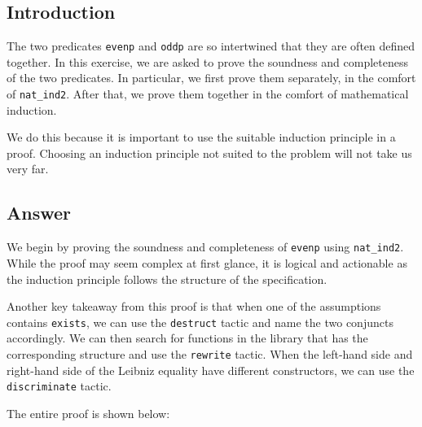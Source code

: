\documentclass{article}
\begin{document}
\subsection{Introduction}
The two predicates \texttt{evenp} and \texttt{oddp} are so intertwined that they are often defined together. In this exercise, we are asked to prove the soundness and completeness of the two predicates. In particular, we first prove them separately, in the comfort of \texttt{nat\_ind2}. After that, we prove them together in the comfort of mathematical induction. 

We do this because it is important to use the suitable induction principle in a proof. Choosing an induction principle not suited to the problem will not take us very far. 

\subsection{Answer}
We begin by proving the soundness and completeness of \texttt{evenp} using \texttt{nat\_ind2}. While the proof may seem complex at first glance, it is logical and actionable as the induction principle follows the structure of the specification. 

Another key takeaway from this proof is that when one of the assumptions contains \texttt{exists}, we can use the \texttt{destruct} tactic and name the two conjuncts accordingly. We can then search for functions in the library that has the corresponding structure and use the \texttt{rewrite} tactic. When the left-hand side and right-hand side of the Leibniz equality have different constructors, we can use the \texttt{discriminate} tactic. 

The entire proof is shown below:
\end{document}
